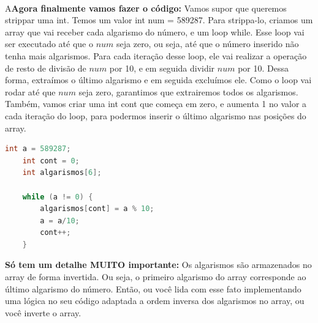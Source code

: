 \documentclass{article}
\begin{document}
\begin{enumerate}
    \\[3pt]
    A\textbf{Agora finalmente vamos fazer o código:} Vamos supor que queremos strippar uma int. Temos um valor int num = 589287. Para strippa-lo, criamos um array que vai receber cada algarismo do número, e um loop while. Esse loop vai ser executado até que o $num$ seja zero, ou seja, até que o número inserido não tenha mais algarismos. Para cada iteração desse loop, ele vai realizar a operação de resto de divisão de $num$ por 10, e em seguida dividir $num$ por 10. Dessa forma, extraímos o último algarismo e em seguida excluímos ele. Como o loop vai rodar até que $num$ seja zero, garantimos que extrairemos todos os algarismos. Também, vamos criar uma int cont que começa em zero, e aumenta 1 no valor a cada iteração do loop, para podermos inserir o último algarismo nas posições do array.
    \begin{lstlisting}[language=C]
    int a = 589287;
    int cont = 0;
    int algarismos[6];

    while (a != 0) {
        algarismos[cont] = a % 10;
        a = a/10;
        cont++;
    }
    \end{lstlisting}
    \textbf{Só tem um detalhe MUITO importante:} Os algarismos são armazenados no array de forma invertida. Ou seja, o primeiro algarismo do array corresponde ao último algarismo do número. Então, ou você lida com esse fato implementando uma lógica no seu código adaptada a ordem inversa dos algarismos no array, ou você inverte o array.
    
\end{enumerate}
\end{document}
